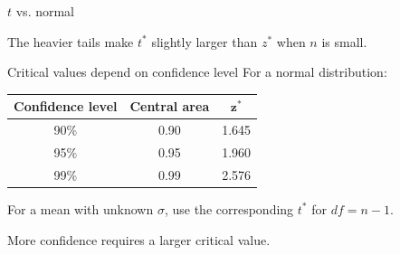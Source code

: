 \documentclass[11pt,aspectratio=169]{beamer}
\begin{document}
\begin{frame}{$t$ vs. normal}
\begin{center}
\end{center}

The heavier tails make $t^*$ slightly larger than $z^*$ when $n$ is small.
\end{frame}

\begin{frame}{Critical values depend on confidence level}
For a normal distribution:

\begin{center}
\renewcommand{\arraystretch}{1.25}
\begin{tabular}{ccc}
\toprule
\textbf{Confidence level} & \textbf{Central area} & $\mathbf{z^*}$ \\
\midrule
90\% & 0.90 & 1.645 \\
95\% & 0.95 & 1.960 \\
99\% & 0.99 & 2.576 \\
\bottomrule
\end{tabular}
\end{center}

\vspace{0.8em}
For a mean with unknown $\sigma$, use the corresponding $t^*$ for $df=n-1$.

\vfill
\alert{More confidence requires a larger critical value.}
\end{frame}
\end{document}
